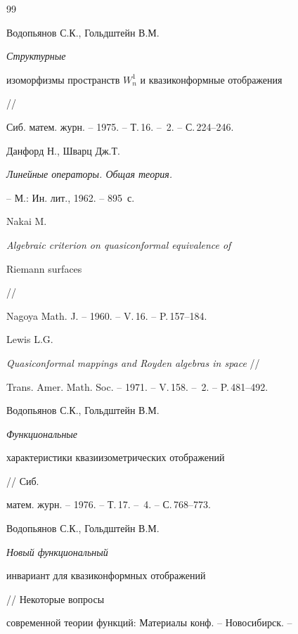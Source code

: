 \begin{thebibliography}{99}







Водопьянов С.К., Гольдштейн В.М. {\it Структурные


изоморфизмы пространств $W^1_n$ и квазиконформные отображения} //


Сиб. матем. журн. -- 1975. -- Т.\,16. -- \No\,2. -- С.\,224--246.







Данфорд Н., Шварц Дж.Т.


{\it Линейные операторы. Общая теория.}


-- М.: Ин. лит., 1962. -- 895~с.







Nakai M. {\it Algebraic criterion on quasiconformal equivalence of 


Riemann surfaces} //


Nagoya Math. J. -- 1960. -- V.\,16. -- P.\,157--184.







Lewis L.G.


{\it Quasiconformal mappings and Royden algebras in space} //


Trans. Amer. Math. Soc. -- 1971. -- V.\,158. -- \No\,2. -- P.\,481--492.







Водопьянов С.К., Гольдштейн В.М. {\it Функциональные


характеристики квазиизометрических отображений} // Сиб.


матем. журн. -- 1976. -- Т.\,17. -- \No\,4. -- С.\,768--773.







Водопьянов С.К., Гольдштейн В.М. {\it Новый функциональный


инвариант для квазиконформных отображений} // Некоторые вопросы


современной теории функций: Материалы конф. -- Новосибирск. --



\end{thebibliography}
